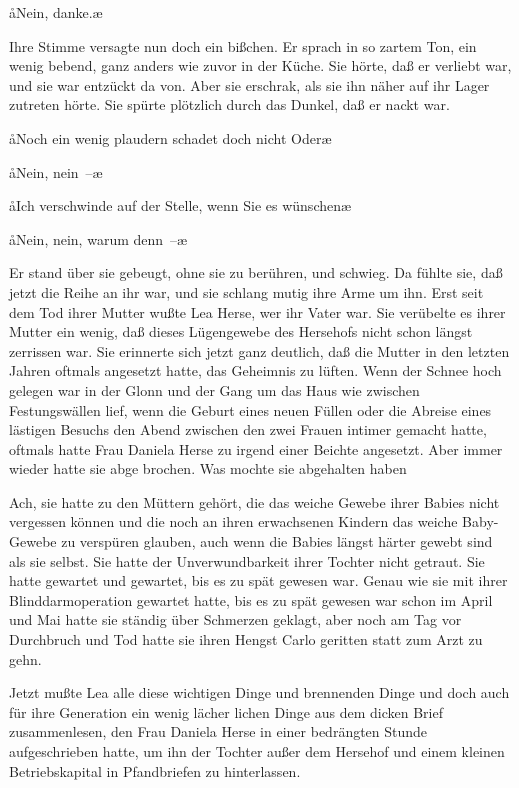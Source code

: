 \aa{}Nein, danke.\ae{}

Ihre Stimme versagte nun doch ein bißchen. Er sprach in so
zartem Ton, ein wenig bebend, ganz anders wie zuvor in der
Küche. Sie hörte, daß er verliebt war, und sie war entzückt da\-%
von. Aber sie erschrak, als sie ihn näher auf ihr Lager zutreten
hörte. Sie spürte plötzlich durch das Dunkel, daß er nackt war.

\aa{}Noch ein wenig plaudern schadet doch nicht\frag{} Oder\frag{}\ae{}

\aa{}Nein, nein~--\ae{}

\aa{}Ich verschwinde auf der Stelle, wenn Sie es wünschen\frag{}\ae{}

\aa{}Nein, nein, warum denn~--\ae{}

Er stand über sie gebeugt, ohne sie zu berühren, und schwieg.
Da fühlte sie, daß jetzt die Reihe an ihr war, und sie schlang
mutig ihre Arme um ihn.
\abstand{}
Erst seit dem Tod ihrer Mutter wußte Lea Herse, wer ihr
Vater war. Sie verübelte es ihrer Mutter ein wenig, daß
dieses Lügengewebe des Hersehofs nicht schon längst zerrissen
war. Sie erinnerte sich jetzt ganz deutlich, daß die Mutter in
den letzten Jahren oftmals angesetzt hatte, das Geheimnis zu
lüften. Wenn der Schnee hoch gelegen war in der Glonn und
der Gang um das Haus wie zwischen Festungswällen lief,
wenn die Geburt eines neuen Füllen oder die Abreise eines
lästigen Besuchs den Abend zwischen den zwei Frauen intimer
gemacht hatte, oftmals hatte Frau Daniela Herse zu irgend
einer Beichte angesetzt. Aber immer wieder hatte sie abge\-%
brochen. Was mochte sie abgehalten haben\frag{}

Ach, sie hatte zu den Müttern gehört, die das weiche Gewebe
ihrer Babies nicht vergessen können und die noch an ihren
erwachsenen Kindern das weiche Baby-Gewebe zu verspüren
glauben, auch wenn die Babies längst härter gewebt sind als
sie selbst. Sie hatte der Unverwundbarkeit ihrer Tochter nicht
getraut. Sie hatte gewartet und gewartet, bis es zu spät
gewesen war. Genau wie sie mit ihrer Blinddarmoperation
gewartet hatte, bis es zu spät gewesen war\dopp{} schon im April
und Mai hatte sie ständig über Schmerzen geklagt, aber noch
am Tag vor Durchbruch und Tod hatte sie ihren Hengst Carlo
geritten statt zum Arzt zu gehn.

Jetzt mußte Lea alle diese wichtigen Dinge und brennenden
Dinge und doch auch für ihre Generation ein wenig lächer\-%
lichen Dinge aus dem dicken Brief zusammenlesen, den Frau
Daniela Herse in einer bedrängten Stunde aufgeschrieben
hatte, um ihn der Tochter außer dem Hersehof und einem
kleinen Betriebskapital in Pfandbriefen zu hinterlassen.

